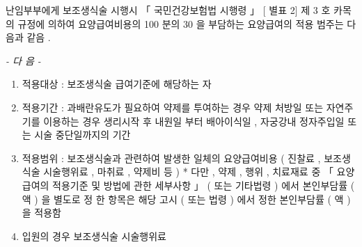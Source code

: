 난임부부에게 보조생식술 시행시  「 국민건강보험법 시행령 」  [ 별표 2]  제 3 호 카목의 규정에 의하여 요양급여비용의  100 분의  30 을 부담하는 요양급여의 적용 범주는 다음과 같음 . \par
\emph{-  다 음  -}\par 
\begin{enumerate}[가.]\tightlist
\item 적용대상 :  보조생식술 급여기준에 해당하는 자 
\item 적용기간 :  과배란유도가 필요하여  약제를  투여하는 경우 약제  처방일 또는 자연주기를 이용하는 경우  생리시작 후 내원일 부터 배아이식일 ,  자궁강내  정자주입일 또는 시술 중단일까지의 기간 
\item 적용범위 :  보조생식술과 관련하여 발생한 일체의 요양급여비용 ( 진찰료 ,  보조생식술 시술행위료 ,  마취료 ,  약제비 등 ) \newline
 *  다만 ,  약제 ,  행위 ,  치료재료 중  「 요양급여의 적용기준  및  방법에 관한 세부사항 」 ( 또는 기타법령 ) 에서 본인부담률 ( 액 ) 을 별도로  정 한 항목은 해당 고시 ( 또는 법령 ) 에서 정한  본인부담률 ( 액 ) 을 적용함 
\item 입원의 경우 보조생식술 시술행위료 
\end{enumerate} 



